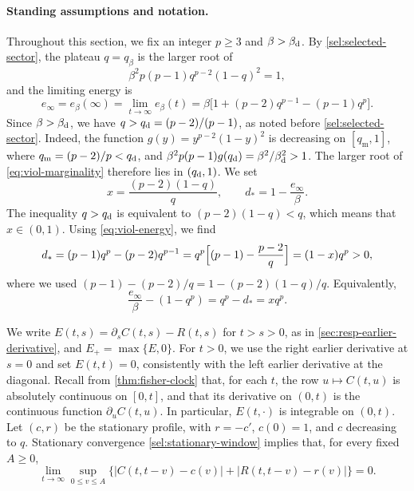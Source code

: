 \paragraph{Standing assumptions and notation.}
Throughout this section, we fix an integer $p\ge3$ and $\beta>\beta_{\mathrm d}$. By \cref{sel:selected-sector}, the plateau $q=q_\beta$ is the larger root of
\begin{equation}\label{eq:viol-marginality}
 \beta^2p(p-1)q^{p-2}(1-q)^2=1,
\end{equation}
and the limiting energy is
\begin{equation}\label{eq:viol-energy}
 e_\infty=e_\beta(\infty)=\lim_{t\to\infty}e_\beta(t)=\beta\bigl[1+(p-2)q^{p-1}-(p-1)q^p\bigr].
\end{equation}
Since $\beta>\beta_{\mathrm d}$, we have $q>q_{\mathrm d}=(p-2)/(p-1)$, as noted before \cref{sel:selected-sector}. Indeed, the function $g(y)=y^{p-2}(1-y)^2$ is decreasing on $[q_{\mathrm m},1]$, where $q_{\mathrm m}=(p-2)/p<q_{\mathrm d}$, and $\beta^2p(p-1)g(q_{\mathrm d})=\beta^2/\beta_{\mathrm d}^2>1$. The larger root of \eqref{eq:viol-marginality} therefore lies in $(q_{\mathrm d},1)$. We set
\begin{equation}\label{eq:viol-x-dstar}
 x=\frac{(p-2)(1-q)}q,\qquad d_*=1-\frac{e_\infty}\beta.
\end{equation}
The inequality $q>q_{\mathrm d}$ is equivalent to $(p-2)(1-q)<q$, which means that $x\in(0,1)$. Using \eqref{eq:viol-energy}, we find
\[
 d_*=(p-1)q^p-(p-2)q^{p-1}=q^p\Bigl[(p-1)-\frac{p-2}q\Bigr]=(1-x)q^p>0,
\]
where we used $(p-1)-(p-2)/q=1-(p-2)(1-q)/q$. Equivalently,
\begin{equation}\label{eq:viol-old-budget}
 \frac{e_\infty}\beta-(1-q^p)=q^p-d_*=xq^p.
\end{equation}

We write $E(t,s)=\partial_sC(t,s)-R(t,s)$ for $t>s>0$, as in \cref{sec:resp-earlier-derivative}, and $E_+=\max\{E,0\}$. For $t>0$, we use the right earlier derivative at $s=0$ and set $E(t,t)=0$, consistently with the left earlier derivative at the diagonal. Recall from \cref{thm:fisher-clock} that, for each $t$, the row $u\mapsto C(t,u)$ is absolutely continuous on $[0,t]$, and that its derivative on $(0,t)$ is the continuous function $\partial_uC(t,u)$. In particular, $E(t,\cdot)$ is integrable on $(0,t)$. Let $(c,r)$ be the stationary profile, with $r=-c'$, $c(0)=1$, and $c$ decreasing to $q$. Stationary convergence \eqref{sel:stationary-window} implies that, for every fixed $A\ge0$,
\begin{equation}\label{eq:viol-recent-strip}
 \lim_{t\to\infty}\sup_{0\le v\le A}\bigl\{|C(t,t-v)-c(v)|+|R(t,t-v)-r(v)|\bigr\}=0.
\end{equation}

